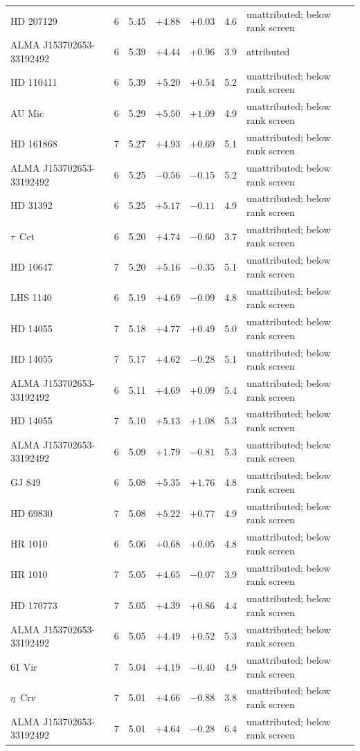 \begin{tabular}{@{}llrrrrl@{}}
HD 207129 & 6 & 5.45 & $+4.88$ & $+0.03$ & 4.6 & unattributed; below rank screen \\
ALMA J153702653-33192492 & 6 & 5.39 & $+4.44$ & $+0.96$ & 3.9 & attributed \\
HD 110411 & 6 & 5.39 & $+5.20$ & $+0.54$ & 5.2 & unattributed; below rank screen \\
AU Mic & 6 & 5.29 & $+5.50$ & $+1.09$ & 4.9 & unattributed; below rank screen \\
HD 161868 & 7 & 5.27 & $+4.93$ & $+0.69$ & 5.1 & unattributed; below rank screen \\
ALMA J153702653-33192492 & 6 & 5.25 & $-0.56$ & $-0.15$ & 5.2 & unattributed; below rank screen \\
HD 31392 & 6 & 5.25 & $+5.17$ & $-0.11$ & 4.9 & unattributed; below rank screen \\
$\tau$~Cet & 6 & 5.20 & $+4.74$ & $-0.60$ & 3.7 & unattributed; below rank screen \\
HD 10647 & 7 & 5.20 & $+5.16$ & $-0.35$ & 5.1 & unattributed; below rank screen \\
LHS 1140 & 6 & 5.19 & $+4.69$ & $-0.09$ & 4.8 & unattributed; below rank screen \\
HD 14055 & 7 & 5.18 & $+4.77$ & $+0.49$ & 5.0 & unattributed; below rank screen \\
HD 14055 & 7 & 5.17 & $+4.62$ & $-0.28$ & 5.1 & unattributed; below rank screen \\
ALMA J153702653-33192492 & 6 & 5.11 & $+4.69$ & $+0.09$ & 5.4 & unattributed; below rank screen \\
HD 14055 & 7 & 5.10 & $+5.13$ & $+1.08$ & 5.3 & unattributed; below rank screen \\
ALMA J153702653-33192492 & 6 & 5.09 & $+1.79$ & $-0.81$ & 5.3 & unattributed; below rank screen \\
GJ 849 & 6 & 5.08 & $+5.35$ & $+1.76$ & 4.8 & unattributed; below rank screen \\
HD 69830 & 7 & 5.08 & $+5.22$ & $+0.77$ & 4.9 & unattributed; below rank screen \\
HR 1010 & 6 & 5.06 & $+0.68$ & $+0.05$ & 4.8 & unattributed; below rank screen \\
HR 1010 & 7 & 5.05 & $+4.65$ & $-0.07$ & 3.9 & unattributed; below rank screen \\
HD 170773 & 7 & 5.05 & $+4.39$ & $+0.86$ & 4.4 & unattributed; below rank screen \\
ALMA J153702653-33192492 & 6 & 5.05 & $+4.49$ & $+0.52$ & 5.3 & unattributed; below rank screen \\
61 Vir & 7 & 5.04 & $+4.19$ & $-0.40$ & 4.9 & unattributed; below rank screen \\
$\eta$~Crv & 7 & 5.01 & $+4.66$ & $-0.88$ & 3.8 & unattributed; below rank screen \\
ALMA J153702653-33192492 & 7 & 5.01 & $+4.64$ & $-0.28$ & 6.4 & unattributed; below rank screen \\
\bottomrule
\end{tabular}
